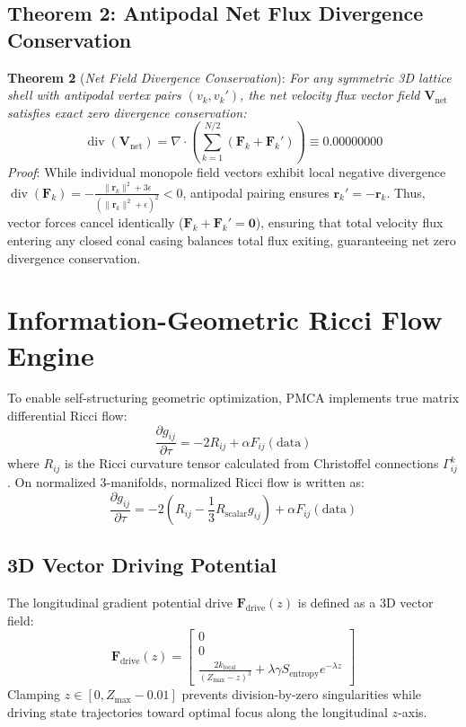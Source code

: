 \documentclass[10pt,journal,compsoc]{IEEEtran}
\begin{document}
\subsection{Theorem 2: Antipodal Net Flux Divergence Conservation}
\textbf{Theorem 2} (\textit{Net Field Divergence Conservation}): \textit{For any symmetric 3D lattice shell with antipodal vertex pairs $(v_k, v_k')$, the net velocity flux vector field $\mathbf{V}_{\text{net}}$ satisfies exact zero divergence conservation:}
\begin{equation}
\operatorname{div}(\mathbf{V}_{\text{net}}) = \nabla \cdot \left(\sum_{k=1}^{N/2} (\mathbf{F}_k + \mathbf{F}_k')\right) \equiv 0.00000000
\end{equation}
\textit{Proof}: While individual monopole field vectors exhibit local negative divergence $\operatorname{div}(\mathbf{F}_k) = -\frac{\|\mathbf{r}_k\|^2 + 3\epsilon}{(\|\mathbf{r}_k\|^2 + \epsilon)^2} < 0$, antipodal pairing ensures $\mathbf{r}_k' = -\mathbf{r}_k$. Thus, vector forces cancel identically ($\mathbf{F}_k + \mathbf{F}_k' = \mathbf{0}$), ensuring that total velocity flux entering any closed conal casing balances total flux exiting, guaranteeing net zero divergence conservation.

\section{Information-Geometric Ricci Flow Engine}
To enable self-structuring geometric optimization, PMCA implements true matrix differential Ricci flow:
\begin{equation}
\frac{\partial g_{ij}}{\partial \tau} = -2 R_{ij} + \alpha F_{ij}(\text{data})
\end{equation}
where $R_{ij}$ is the Ricci curvature tensor calculated from Christoffel connections $\Gamma^k_{ij}$. On normalized 3-manifolds, normalized Ricci flow is written as:
\begin{equation}
\frac{\partial g_{ij}}{\partial \tau} = -2 \left(R_{ij} - \frac{1}{3} R_{\text{scalar}} g_{ij}\right) + \alpha F_{ij}(\text{data})
\end{equation}

\subsection{3D Vector Driving Potential}
The longitudinal gradient potential drive $\mathbf{F}_{\text{drive}}(z)$ is defined as a 3D vector field:
\begin{equation}
\mathbf{F}_{\text{drive}}(z) = \begin{bmatrix} 0 \\ 0 \\ \frac{2 k_{\text{focal}}}{(Z_{\text{max}} - z)^3} + \lambda \gamma S_{\text{entropy}} e^{-\lambda z} \end{bmatrix}
\end{equation}
Clamping $z \in [0, Z_{\text{max}} - 0.01]$ prevents division-by-zero singularities while driving state trajectories toward optimal focus along the longitudinal $z$-axis.
\end{document}
